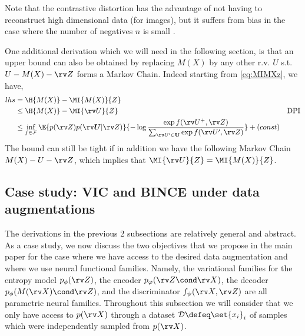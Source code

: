 \documentclass[final]{article}
\begin{document}
Note that the contrastive distortion has the advantage of not having to reconstruct high dimensional data (\eg for images), but it suffers from bias in the case where the number of negatives $n$ is small \cite{poole_variational_2019}.

One additional derivation which we will need in the following section, is that an upper bound can also be obtained by replacing $M(X)$ by any other r.v. $U$ s.t. $U - M(X) - \rv Z$ forms a Markov Chain. 
Indeed starting from \cref{eq:MIMXz}, we have,
\begin{align}\label{eq:contrastive_distortion_bound_markov}
lhs &= \H{M(X)} - \MI{M(X)}{Z} \\
&\leq \H{M(X)} - \MI{\rv U}{Z} & \text{DPI}\\
&\leq \inf_{f \in \mathcal{F}}  \E{p(\rv Z) p(\boldsymbol{\rv U} | \rv Z)}{- \log \frac{\exp f(\rv U^+, \rv Z)}{\sum_{\rv U' \in \mathbf{U}} \exp f(\rv U', \rv Z) }} + (const)   
\end{align}
The bound can still be tight if in addition we have the following Markov Chain $ M(X) - U -\rv Z$, which implies that $\MI{\rv U}{Z} = \MI{M(X)}{Z}$.


\subsection{Case study: VIC and BINCE under data augmentations}
\label{appx:vic_bince}

The derivations in the previous 2 subsections are relatively general and abstract.
As a case study, we now discuss the two objectives that we propose in the main paper for the case where we have access to the desired data augmentation  and where we use neural functional families.
Namely, the variational families for the entropy model $p_{\phi}(\rv Z)$, the encoder $p_{\varphi}(\rv Z \cond \rv X)$, the decoder $p_{\phi}(M(\rv X) \cond \rv Z)$, and the discriminator $f_{\psi}(\rv X , \rv Z)$ are all parametric neural families.
Throughout this subsection we will consider that we only have access to $p(\rv X)$ through a dataset $\mathcal{D} \defeq \set{x_i}_{i}$ of samples which were independently sampled from $p(\rv X)$.
\end{document}
